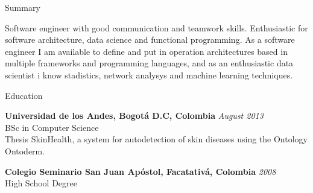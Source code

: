 \documentclass[spanish]{resume}
\begin{document}

\begin{rSection}{Summary}

Software engineer with good communication and teamwork skills. Enthusiastic for software architecture, data science and functional programming. As a software engineer I am available to define and put in operation architectures based in multiple frameworks and programming languages, and as an enthusiastic data scientist i know stadistics, network analysys and machine learning techniques.

\end{rSection}


\begin{rSection}{Education}

{\bf Universidad de los Andes, Bogot\'a D.C, Colombia} \hfill {\em August 2013} \\
BSc in Computer Science \\
Thesis SkinHealth, a system for autodetection of skin diseases using the Ontology Ontoderm.

{\bf Colegio Seminario San Juan Ap\'ostol, Facatativ\'a, Colombia} \hfill {\em 2008} \\
 High School Degree

\end{rSection}
\end{document}
